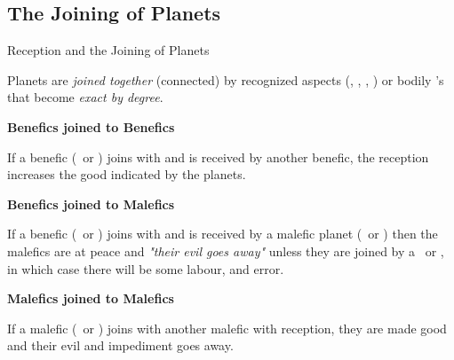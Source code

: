 \subsection{The Joining of Planets}
\begin{frame}[t]{Reception and the Joining of Planets}
\begin{block}{}
 Planets are \textsl{joined together} (connected) by recognized aspects (\Sextile, \Square, \Trine, \Opposition) or bodily \Conjunction's that become \textsl{exact by degree}.
 \end{block}
\textbf{Benefics joined to Benefics}\footnotemark[1]

If a benefic (\Venus\ or \Jupiter) joins with and is received by another benefic, the reception increases the good indicated by the planets.

\textbf{Benefics joined to Malefics}

If a benefic (\Venus\ or \Jupiter) joins with and is received by a malefic planet (\Mars\ or \Saturn) then the malefics are at peace and \textsl{"their evil goes away"} unless they are joined by a \Square\ or \Opposition, in which case there will be some labour, and error.

\textbf{Malefics joined to Malefics}

If a malefic (\Mars\ or \Saturn) joins with another malefic with reception, they are made good and their evil and impediment goes away.
\vspace{0.5cm}

\end{frame}